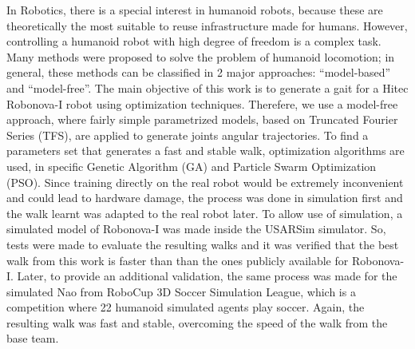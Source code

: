 In Robotics, there is a special interest in humanoid robots, because these are theoretically the most suitable to reuse infrastructure made for humans. However, controlling a humanoid robot with high degree of freedom is a complex task. Many methods were proposed to solve the problem of humanoid locomotion; in general, these methods can be classified in 2 major approaches: ``model-based'' and ``model-free''. The main objective of this work is to generate a gait for a Hitec Robonova-I robot using optimization techniques. Therefere, we use a model-free approach, where fairly simple parametrized models, based on Truncated Fourier Series (TFS), are applied to generate joints angular trajectories. To find a parameters set that generates a fast and stable walk, optimization algorithms are used, in specific Genetic Algorithm (GA) and Particle Swarm Optimization (PSO). Since training directly on the real robot would be extremely inconvenient and could lead to hardware damage, the process was done in simulation first and the walk learnt was adapted to the real robot later. To allow use of simulation, a simulated model of Robonova-I was made inside the USARSim simulator. So, tests were made to evaluate the resulting walks and it was verified that the best walk from this work is faster than than the ones publicly available for Robonova-I. Later, to provide an additional validation, the same process was made for the simulated Nao from RoboCup 3D Soccer Simulation League, which is a competition where 22 humanoid simulated agents play soccer. Again, the resulting walk was fast and stable, overcoming the speed of the walk from the base team.